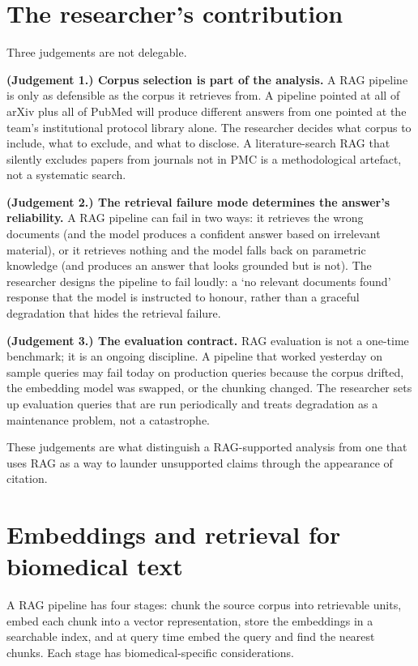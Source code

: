 \documentclass[
  letterpaper,
  11pt]{scrbook}
\begin{document}
\section{The researcher's contribution}\label{sec-rag-biomedical-human}

Three judgements are not delegable.

\textbf{(Judgement 1.) Corpus selection is part of the analysis.} A RAG
pipeline is only as defensible as the corpus it retrieves from. A
pipeline pointed at all of arXiv plus all of PubMed will produce
different answers from one pointed at the team's institutional protocol
library alone. The researcher decides what corpus to include, what to
exclude, and what to disclose. A literature-search RAG that silently
excludes papers from journals not in PMC is a methodological artefact,
not a systematic search.

\textbf{(Judgement 2.) The retrieval failure mode determines the
answer's reliability.} A RAG pipeline can fail in two ways: it retrieves
the wrong documents (and the model produces a confident answer based on
irrelevant material), or it retrieves nothing and the model falls back
on parametric knowledge (and produces an answer that looks grounded but
is not). The researcher designs the pipeline to fail loudly: a `no
relevant documents found' response that the model is instructed to
honour, rather than a graceful degradation that hides the retrieval
failure.

\textbf{(Judgement 3.) The evaluation contract.} RAG evaluation is not a
one-time benchmark; it is an ongoing discipline. A pipeline that worked
yesterday on sample queries may fail today on production queries because
the corpus drifted, the embedding model was swapped, or the chunking
changed. The researcher sets up evaluation queries that are run
periodically and treats degradation as a maintenance problem, not a
catastrophe.

These judgements are what distinguish a RAG-supported analysis from one
that uses RAG as a way to launder unsupported claims through the
appearance of citation.

\section{Embeddings and retrieval for biomedical
text}\label{embeddings-and-retrieval-for-biomedical-text}

A RAG pipeline has four stages: chunk the source corpus into retrievable
units, embed each chunk into a vector representation, store the
embeddings in a searchable index, and at query time embed the query and
find the nearest chunks. Each stage has biomedical-specific
considerations.
\end{document}
